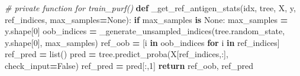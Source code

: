 \documentclass[
  11pt,
  oneside]{book}
\newenvironment{Shaded}{\begin{snugshade}}{\end{snugshade}}
\newcommand{\BuiltInTok}[1]{#1}
\newcommand{\CommentTok}[1]{\textcolor[rgb]{0.56,0.35,0.01}{\textit{#1}}}
\newcommand{\ControlFlowTok}[1]{\textcolor[rgb]{0.13,0.29,0.53}{\textbf{#1}}}
\newcommand{\DecValTok}[1]{\textcolor[rgb]{0.00,0.00,0.81}{#1}}
\newcommand{\KeywordTok}[1]{\textcolor[rgb]{0.13,0.29,0.53}{\textbf{#1}}}
\newcommand{\NormalTok}[1]{#1}
\newcommand{\OperatorTok}[1]{\textcolor[rgb]{0.81,0.36,0.00}{\textbf{#1}}}
\newcommand{\VariableTok}[1]{\textcolor[rgb]{0.00,0.00,0.00}{#1}}
\begin{document}
\begin{Shaded}
\begin{Highlighting}[]
\CommentTok{\# private function for train\_purf()}
\KeywordTok{def}\NormalTok{ \_get\_ref\_antigen\_stats(idx, tree, X, y, ref\_indices, max\_samples}\OperatorTok{=}\VariableTok{None}\NormalTok{):}
    \ControlFlowTok{if}\NormalTok{ max\_samples }\KeywordTok{is} \VariableTok{None}\NormalTok{:}
\NormalTok{        max\_samples }\OperatorTok{=}\NormalTok{ y.shape[}\DecValTok{0}\NormalTok{]}
\NormalTok{    oob\_indices }\OperatorTok{=}\NormalTok{ \_generate\_unsampled\_indices(tree.random\_state, y.shape[}\DecValTok{0}\NormalTok{], max\_samples)}
\NormalTok{    ref\_oob }\OperatorTok{=}\NormalTok{ [i }\KeywordTok{in}\NormalTok{ oob\_indices }\ControlFlowTok{for}\NormalTok{ i }\KeywordTok{in}\NormalTok{ ref\_indices]}
\NormalTok{    ref\_pred }\OperatorTok{=} \BuiltInTok{list}\NormalTok{()}
\NormalTok{    pred }\OperatorTok{=}\NormalTok{ tree.predict\_proba(X[ref\_indices,:], check\_input}\OperatorTok{=}\VariableTok{False}\NormalTok{)}
\NormalTok{    ref\_pred }\OperatorTok{=}\NormalTok{ pred[:,}\DecValTok{1}\NormalTok{]}
    \ControlFlowTok{return}\NormalTok{ ref\_oob, ref\_pred}
\end{Highlighting}
\end{Shaded}
\end{document}
